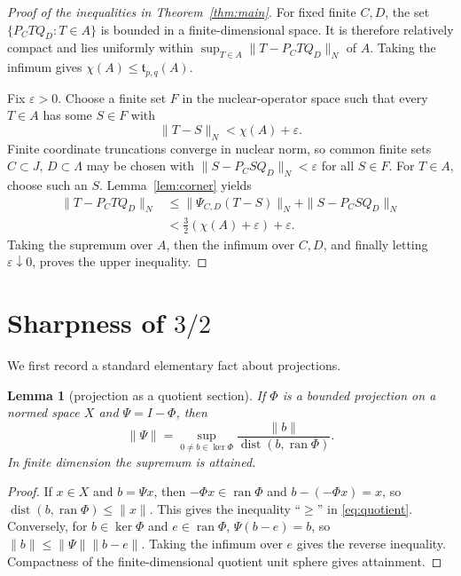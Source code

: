 \documentclass[11pt]{article}
\newtheorem{lemma}[theorem]{Lemma}
\newcommand{\Tail}{\mathfrak t}
\newcommand{\dist}{\operatorname{dist}}
\begin{document}
\begin{proof}[Proof of the inequalities in Theorem~\ref{thm:main}]
For fixed finite \(C,D\), the set
\(\{P_CTQ_D:T\in A\}\) is bounded in a finite-dimensional space.  It is
therefore relatively compact and lies uniformly within
\(\sup_{T\in A}\|T-P_CTQ_D\|_N\) of \(A\).  Taking the infimum gives
\(\chi(A)\le\Tail_{p,q}(A)\).

Fix \(\varepsilon>0\).  Choose a finite set \(F\) in the nuclear-operator
space such that every \(T\in A\) has some \(S\in F\) with
\[
 \|T-S\|_N<\chi(A)+\varepsilon.
\]
Finite coordinate truncations converge in nuclear norm, so common finite sets
\(C\subset J\), \(D\subset\Lambda\) may be chosen with
\(\|S-P_CS Q_D\|_N<\varepsilon\) for all \(S\in F\).  For \(T\in A\), choose
such an \(S\).  Lemma~\ref{lem:corner} yields
\begin{align*}
 \|T-P_CTQ_D\|_N
 &\le \|\Psi_{C,D}(T-S)\|_N+\|S-P_CS Q_D\|_N\\
 &<\frac32(\chi(A)+\varepsilon)+\varepsilon.
\end{align*}
Taking the supremum over \(A\), then the infimum over \(C,D\), and finally
letting \(\varepsilon\downarrow0\), proves the upper inequality.
\end{proof}

\section{Sharpness of \texorpdfstring{$3/2$}{3/2}}

We first record a standard elementary fact about projections.

\begin{lemma}[projection as a quotient section]\label{lem:quotient}
If \(\Phi\) is a bounded projection on a normed space \(X\) and
\(\Psi=I-\Phi\), then
\begin{equation}\label{eq:quotient}
 \|\Psi\|=
 \sup_{0\ne b\in\ker\Phi}
 \frac{\|b\|}{\dist(b,\operatorname{ran}\Phi)}.
\end{equation}
In finite dimension the supremum is attained.
\end{lemma}

\begin{proof}
If \(x\in X\) and \(b=\Psi x\), then \(-\Phi x\in\operatorname{ran}\Phi\)
and \(b-(-\Phi x)=x\), so
\(\dist(b,\operatorname{ran}\Phi)\le\|x\|\).  This gives the inequality
``\(\ge\)'' in \eqref{eq:quotient}.  Conversely, for
\(b\in\ker\Phi\) and \(e\in\operatorname{ran}\Phi\),
\(\Psi(b-e)=b\), so \(\|b\|\le\|\Psi\|\|b-e\|\).  Taking the infimum over
\(e\) gives the reverse inequality.  Compactness of the finite-dimensional
quotient unit sphere gives attainment.
\end{proof}
\end{document}
